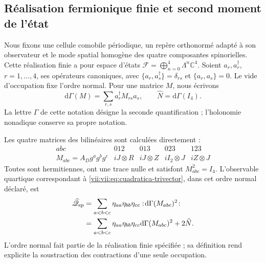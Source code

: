 \subsection{Réalisation fermionique finie et second moment de l'état}
\label{vii:vii:subsec:segundo-momento-car}

Nous fixons une cellule comobile périodique, un repère orthonormé adapté à son
observateur et le mode spatial homogène des quatre composantes
spinorielles. Cette réalisation finie a pour espace d'états
\(\mathcal F=\bigoplus_{n=0}^4\Lambda^n\mathbb C^4\).
Soient \(a_r,a_r^\dagger\), \(r=1,\ldots,4\), ses opérateurs
canoniques, avec
\(\{a_r,a_s^\dagger\}=\delta_{rs}\) et
\(\{a_r,a_s\}=0\). Le vide d'occupation fixe l'ordre
normal. Pour une matrice \(M\), nous écrivons
\[
 \mathrm d\Gamma(M)=\sum_{r,s}a_r^\dagger M_{rs}a_s,
 \qquad \widehat N=\mathrm d\Gamma(I_4).
\]
La lettre \(\Gamma\) de cette notation désigne la seconde
quantification ; l'holonomie nonadique conserve sa propre notation.

Les quatre matrices des bilinéaires sont calculées directement :
\begin{equation}
 \begin{array}{c|cccc}
 abc&012&013&023&123\\ \hline
 M_{abc}=A_Dg^ag^bg^c
       &iJ\otimes R&iJ\otimes Z&iI_2\otimes J&iZ\otimes J
 \end{array}
 \label{vii:vii:eq:matrices-bilineales-espin}
\end{equation}
Toutes sont hermitiennes, ont une trace nulle et satisfont \(M_{abc}^2=I_4\). L'observable quartique correspondant à \eqref{vii:vii:eq:cuadratica-trivector}, dans cet ordre normal déclaré, est
\begin{equation}
 \begin{split}
 \widehat{\mathscr Q}_{\rm sp}
 &=\sum_{a<b<c}\eta_{aa}\eta_{bb}\eta_{cc}
       :\!\mathrm d\Gamma(M_{abc})^2\!:\\
 &=\sum_{a<b<c}\eta_{aa}\eta_{bb}\eta_{cc}
       \mathrm d\Gamma(M_{abc})^2+2\widehat N.
 \end{split}
 \label{vii:vii:eq:observable-cuadratico-espin}
\end{equation}
L'ordre normal fait partie de la réalisation finie spécifiée ;
sa définition rend explicite la soustraction des contractions
d'une seule occupation.

